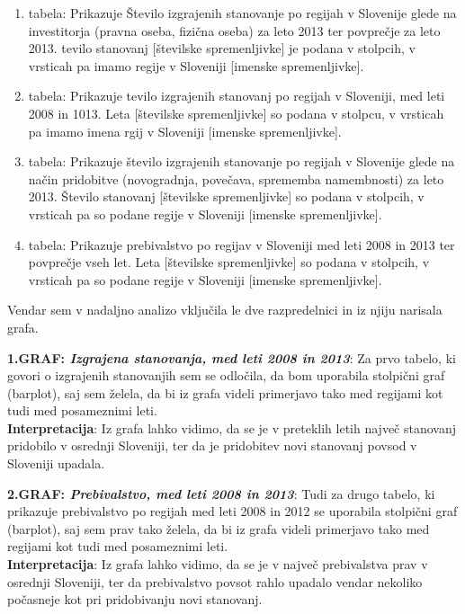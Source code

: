 \documentclass[11pt,a4paper]{article}
\begin{document}
\begin{enumerate}
\item{tabela: Prikazuje Število izgrajenih stanovanje po regijah v Slovenije glede na investitorja (pravna oseba, fizična oseba) za leto 2013 ter povprečje za leto 2013. tevilo stanovanj [številske spremenljivke] je podana v stolpcih, v vrsticah pa imamo regije v Sloveniji [imenske spremenljivke].}
\item{tabela: Prikazuje tevilo izgrajenih stanovanj po regijah v Sloveniji, med leti 2008 in 1013. Leta [številske spremenljivke] so podana v stolpcu, v vrsticah pa imamo imena rgij v Sloveniji [imenske spremenljivke].}
\item{tabela: Prikazuje število izgrajenih stanovanje po regijah v Slovenije glede na način pridobitve (novogradnja, povečava, sprememba namembnosti) za leto 2013. Število stanovanj [številske spremenljivke] so podana v stolpcih, v vrsticah pa so podane regije v Sloveniji [imenske spremenljivke].}
\item{tabela: Prikazuje prebivalstvo po regijav v Sloveniji med leti 2008 in 2013 ter povprečje vseh let. Leta [številske spremenljivke] so podana v stolpcih, v vrsticah pa so podane regije v Sloveniji [imenske spremenljivke].}
\end{enumerate}

Vendar sem v nadaljno analizo vključila le dve razpredelnici in iz njiju narisala grafa.

\newpage
\textbf{1.GRAF: \emph{Izgrajena stanovanja, med leti 2008 in 2013}}: Za prvo tabelo, ki govori o izgrajenih stanovanjih sem se odločila, da bom uporabila stolpični graf (barplot), saj sem želela, da bi iz grafa videli primerjavo tako med regijami kot tudi med posameznimi leti.\\
\textbf{Interpretacija}: Iz grafa lahko vidimo, da se je v preteklih letih največ stanovanj pridobilo v osrednji Sloveniji, ter da je pridobitev novi stanovanj povsod v Sloveniji upadala.

\makebox[\textwidth][c]{

}

\newpage
\textbf{2.GRAF: \emph{Prebivalstvo, med leti 2008 in 2013}}: Tudi za drugo tabelo, ki prikazuje prebivalstvo po regijah med leti 2008 in 2012 se uporabila stolpični graf (barplot), saj sem prav tako želela, da bi iz grafa videli primerjavo tako med regijami kot tudi med posameznimi leti.\\
\textbf{Interpretacija}: Iz grafa lahko vidimo, da se je v največ prebivalstva prav v osrednji Sloveniji, ter da prebivalstvo povsot rahlo upadalo vendar nekoliko počasneje kot pri pridobivanju novi stanovanj.
\end{document}
